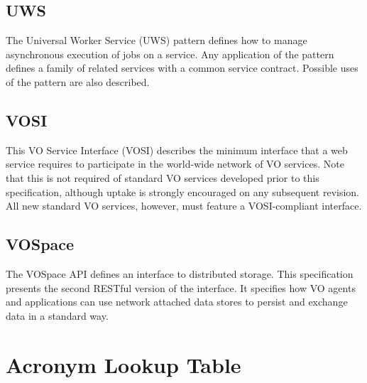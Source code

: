 \documentclass[11pt,letter]{ivoa}
\begin{document}
{\subsection{UWS} 

The Universal Worker Service (UWS) \citep{2016ivoa.spec.1024H} pattern
defines how to manage asynchronous execution
of jobs on a service. Any application of the pattern defines a family of
related services
with a common service contract. Possible uses of the pattern are also
described.

\subsection{VOSI} 

This VO Service Interface (VOSI) \citep{2017ivoa.spec.0524G} describes
the minimum interface that a web service requires to
participate in the world-wide network of VO services. Note that this is
not required of
standard VO services developed prior to this specification, although
uptake is strongly
encouraged on any subsequent revision. All new standard VO services,
however, must feature
a VOSI-compliant interface. 

\subsection{VOSpace}

The VOSpace \citep{2018ivoa.spec.0621G} API defines an interface to
distributed storage. This specification presents the
second RESTful version of the interface. It specifies how VO agents and
applications can
use network attached data stores to persist and exchange data in a
standard way.

\pagebreak
\section{Acronym Lookup Table}

}
\end{document}
